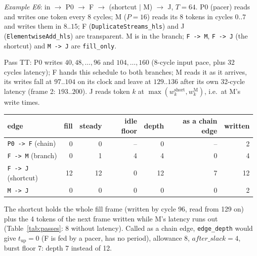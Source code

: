 \documentclass[10pt,a4paper]{article}
\newcommand{\code}[1]{\texttt{#1}}
\newcommand{\Tg}{T}           %
\begin{document}
\emph{Example E6}: in $\to$ P0 $\to$ F $\to$ (shortcut $|$ M) $\to$ J, $\Tg=64$.
P0 (pacer) reads and writes one token every 8 cycles; M ($P=16$) reads its 8 tokens in
cycles $0..7$ and writes them in $8..15$; F (\code{DuplicateStreams\_hls}) and J
(\code{ElementwiseAdd\_hls}) are transparent. M is in the branch; \code{F -> M},
\code{F -> J} (the shortcut) and \code{M -> J} are \code{fill\_only}.

\begin{center}
\end{center}

Pass TT: P0 writes $40,48,\dots,96$ and $104,\dots,160$ (8-cycle input pace, plus 32
cycles latency); F hands this schedule to both branches; M reads it as it arrives,
its writes fall at $97..104$ on its clock and leave at $129..136$ after its own 32-cycle
latency (frame 2: $193..200$). J reads token $k$ at $\max(w^{\mathrm{short}}_k,w^{\mathrm{M}}_k)$, i.e.\ at M's write times.

\begin{center}\small
\begin{tabular}{@{}lrrrrrr@{}}
\toprule
edge & fill & steady & idle floor & depth & as a chain edge & written\\
\midrule
\code{P0 -> F} (chain) & 0 & 0 & -- & 0 & -- & 2\\
\code{F -> M} (branch) & 0 & 1 & 4 & 4 & 0 & 4\\
\code{F -> J} (shortcut) & 12 & 12 & 0 & 12 & 7 & 12\\
\code{M -> J} & 0 & 0 & 0 & 0 & 0 & 2\\
\bottomrule
\end{tabular}
\end{center}

The shortcut holds the whole fill frame (written by cycle 96, read from 129 on)
plus the 4 tokens of the next frame written while M's latency runs out
(Table~\ref{tab:passes}: 8 without latency). Called as a chain edge, \code{edge\_depth}
would give $t_{\mathrm{up}}=0$ (F is fed by a pacer, has no period), allowance 8,
$\mathit{after\_slack}=4$, burst floor 7: depth 7 instead of 12.
\end{document}
